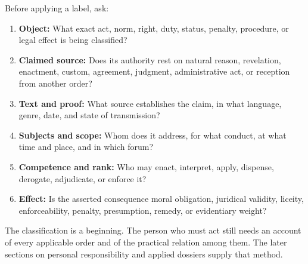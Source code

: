 Before applying a label, ask:

\begin{enumerate}
\item \textbf{Object:} What exact act, norm, right, duty, status, penalty, procedure, or legal effect is being classified?
\item \textbf{Claimed source:} Does its authority rest on natural reason, revelation, enactment, custom, agreement, judgment, administrative act, or reception from another order?
\item \textbf{Text and proof:} What source establishes the claim, in what language, genre, date, and state of transmission?
\item \textbf{Subjects and scope:} Whom does it address, for what conduct, at what time and place, and in which forum?
\item \textbf{Competence and rank:} Who may enact, interpret, apply, dispense, derogate, adjudicate, or enforce it?
\item \textbf{Effect:} Is the asserted consequence moral obligation, juridical validity, liceity, enforceability, penalty, presumption, remedy, or evidentiary weight?
\end{enumerate}

The classification is a beginning. The person who must act still needs an account of every applicable order and of the practical relation among them. The later sections on personal responsibility and applied dossiers supply that method.
